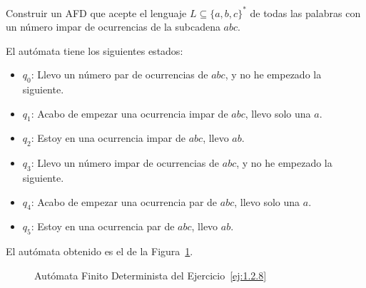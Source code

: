 \begin{ejercicio} \label{ej:1.2.8}
    Construir un AFD que acepte el lenguaje $L \subseteq \{a, b, c\}^*$ de todas las palabras con un número impar de ocurrencias de la subcadena $abc$.

    El autómata tiene los siguientes estados:
    \begin{itemize}
        \item $q_0$: Llevo un número par de ocurrencias de $abc$, y no he empezado la siguiente.
        \item $q_1$: Acabo de empezar una ocurrencia impar de $abc$, llevo solo una $a$.
        \item $q_2$: Estoy en una ocurrencia impar de $abc$, llevo $ab$.
        \item $q_3$: Llevo un número impar de ocurrencias de $abc$, y no he empezado la siguiente.
        \item $q_4$: Acabo de empezar una ocurrencia par de $abc$, llevo solo una $a$.
        \item $q_5$: Estoy en una ocurrencia par de $abc$, llevo $ab$.
    \end{itemize}

    El autómata obtenido es el de la Figura~\ref{fig:ej:1.2.8}.
    \begin{figure}
        \centering
        \caption{Autómata Finito Determinista del Ejercicio~\ref{ej:1.2.8}}
        \label{fig:ej:1.2.8}
    \end{figure}
\end{ejercicio}

